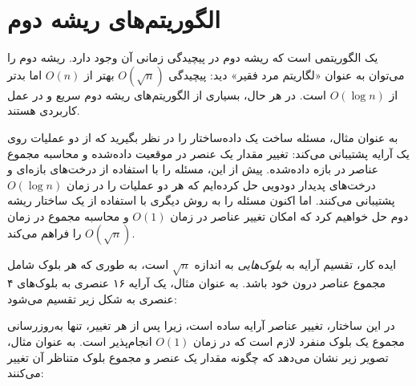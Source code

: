 \chapter{الگوریتم‌های ریشه دوم}


یک  الگوریتمی است
که ریشه دوم در پیچیدگی زمانی آن وجود دارد.
ریشه دوم را می‌توان به عنوان «لگاریتم مرد فقیر» دید:
پیچیدگی $O(\sqrt n)$ بهتر از $O(n)$
اما بدتر از $O(\log n)$ است.
در هر حال، بسیاری از الگوریتم‌های ریشه دوم سریع و در عمل کاربردی هستند.

به عنوان مثال، مسئله ساخت یک داده‌ساختار را در نظر بگیرید
که از دو عملیات روی یک آرایه پشتیبانی می‌کند:
تغییر مقدار یک عنصر در موقعیت داده‌شده
و محاسبه مجموع عناصر در بازه داده‌شده.
پیش از این، مسئله را با استفاده از درخت‌های بازه‌ای و درخت‌های پدیدار دودویی حل کرده‌ایم
که هر دو عملیات را در زمان $O(\log n)$ پشتیبانی می‌کنند.
اما اکنون مسئله را به روش دیگری
با استفاده از یک ساختار ریشه دوم حل خواهیم کرد
که امکان تغییر عناصر در زمان $O(1)$
و محاسبه مجموع در زمان $O(\sqrt n)$ را فراهم می‌کند.

ایده کار، تقسیم آرایه به \emph{بلوک‌هایی}
به اندازه $\sqrt n$ است، به طوری که هر بلوک
شامل مجموع عناصر درون خود باشد.
به عنوان مثال، یک آرایه ۱۶ عنصری
به بلوک‌های ۴ عنصری به شکل زیر تقسیم می‌شود:

\begin{center}
\end{center}

در این ساختار،
تغییر عناصر آرایه ساده است،
زیرا پس از هر تغییر،
تنها به‌روزرسانی مجموع یک بلوک منفرد لازم است
که در زمان $O(1)$ انجام‌پذیر است.
به عنوان مثال، تصویر زیر نشان می‌دهد
که چگونه مقدار یک عنصر و مجموع بلوک متناظر آن تغییر می‌کنند:

